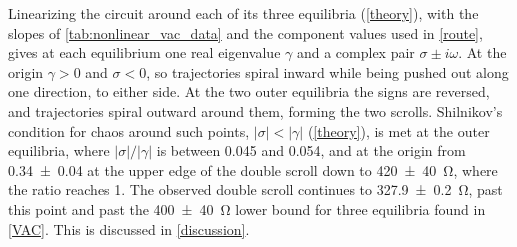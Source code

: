Linearizing the circuit around each of its three equilibria (\cref{theory}), with the slopes of \cref{tab:nonlinear_vac_data} and the component values used in \cref{route}, gives at each equilibrium one real eigenvalue $\gamma$ and a complex pair $\sigma\pm i\omega$. At the origin $\gamma>0$ and $\sigma<0$, so trajectories spiral inward while being pushed out along one direction, to either side. At the two outer equilibria the signs are reversed, and trajectories spiral outward around them, forming the two scrolls. Shilnikov's condition for chaos around such points, $|\sigma|<|\gamma|$ (\cref{theory}), is met at the outer equilibria, where $|\sigma|/|\gamma|$ is between \num{0.045} and \num{0.054}, and at the origin from \num{0.34\pm0.04} at the upper edge of the double scroll down to \qty{420\pm40}{\ohm}, where the ratio reaches 1. The observed double scroll continues to \qty{327.9\pm0.2}{\ohm}, past this point and past the \qty{400\pm40}{\ohm} lower bound for three equilibria found in \cref{VAC}. This is discussed in \cref{discussion}.
